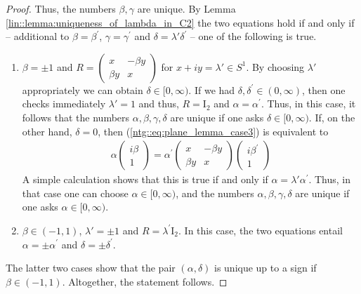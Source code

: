 \documentclass{amsart}
\begin{document}
\begin{proof}
    Thus, the numbers $\beta, \gamma$ are unique. 
    By Lemma \ref{lin::lemma:uniqueness_of_lambda_in_C2} the two equations hold if and only if -- additional to $\beta = \beta^\prime$, $\gamma = \gamma^\prime$ and $\delta = \lambda'\delta^\prime$ -- one of the following is true.
    \begin{enumerate}[label=(\alph*)]
        \item $\beta =\pm 1$ and $\displaystyle R = \begin{pmatrix}
            x & -\beta y \\
            \beta y & x
        \end{pmatrix}$
        for $x+ iy = \lambda' \in S^1$. By choosing $\lambda'$ appropriately we can obtain $\delta \in [0, \infty)$. If we had $\delta, \delta^\prime \in (0, \infty)$, then one checks immediately $\lambda' = 1$ and thus, $R=\mathrm{I}_2$ and $\alpha = \alpha^\prime$. Thus, in this case, it  follows that the numbers $\alpha, \beta, \gamma, \delta$ are unique if one asks $\delta \in [0, \infty)$. If, on the other hand, $\delta = 0$, then (\ref{ntg::eq:plane_lemma_case3}) is equivalent to
        \begin{align*}
            \alpha \begin{pmatrix}
                i \beta \\ 1
            \end{pmatrix}
            = \alpha^\prime 
            \begin{pmatrix}
                x & -\beta y \\
                \beta y & x
            \end{pmatrix}
            \begin{pmatrix}
                i \beta^\prime \\ 1
            \end{pmatrix}
        \end{align*}
        A simple calculation shows that this is true if and only if $\alpha = \lambda' \alpha^\prime$. 
        Thus, in that case one can choose $\alpha \in [0, \infty)$, and the numbers $\alpha, \beta, \gamma, \delta$ are unique if one asks $\alpha \in [0, \infty)$.
        \item $\beta \in (-1,1)$, $\lambda' = \pm 1$ and $R =\lambda^\prime \mathrm{I}_2$. In this case, the two equations entail $\alpha = \pm\alpha^\prime$ and $\delta = \pm\delta^\prime$.
    \end{enumerate}
    The latter two cases show that the pair $(\alpha, \delta)$ is unique up to a sign if $\beta \in (-1,1)$. Altogether, the statement follows.
\end{proof}
\end{document}
